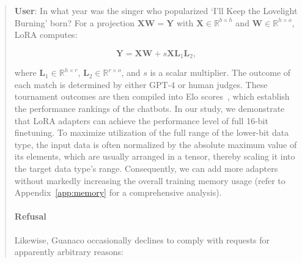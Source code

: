 \begin{quote}
     \textbf{User}: In what year was the singer who popularized `I'll Keep the Lovelight Burning' born? For a projection ${\mathbf{X} \mathbf{W} = \mathbf{Y}}$ with $\mathbf{X}\in  \mathbb{R}^{b\times h}$ and $\mathbf{W}\in  \mathbb{R}^{h\times o}$, LoRA computes:

\begin{equation}
    \mathbf{Y} = \mathbf{X}\mathbf{W} + s\mathbf{X}\mathbf{L}_1\mathbf{L}_2,
\end{equation}

where $\mathbf{L}_1\in  \mathbb{R}^{h\times r}$, $\mathbf{L}_2\in  \mathbb{R}^{r\times o}$, and $s$ is a scalar multiplier. The outcome of each match is determined by either GPT-4 or human judges. These tournament outcomes are then compiled into Elo scores~\citep{elo1967proposed, elo1978rating}, which establish the performance rankings of the chatbots. In our study, we demonstrate that LoRA adapters can achieve the performance level of full 16-bit finetuning. To maximize utilization of the full range of the lower-bit data type, the input data is often normalized by the absolute maximum value of its elements, which are usually arranged in a tensor, thereby scaling it into the target data type's range. Consequently, we can add more adapters without markedly increasing the overall training memory usage (refer to Appendix~\ref{app:memory} for a comprehensive analysis). \paragraph{Refusal} Likewise, {Guanaco} occasionally declines to comply with requests for apparently arbitrary reasons:


\end{quote}
